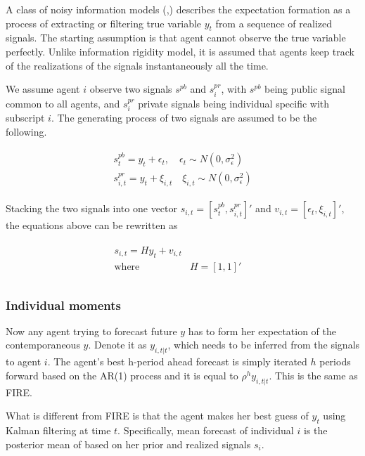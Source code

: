 \documentclass[]{article}
\begin{document}
	A class of noisy information models (\citet{},\citet{}) describes the expectation formation as a process of extracting or filtering true variable $y_t$ from a sequence of realized signals. The starting assumption is that agent cannot observe the true variable perfectly. Unlike information rigidity model, it is assumed that agents keep track of the realizations of the signals instantaneously all the time. 
	
	We assume agent $i$ observe two signals $s^{pb}$ and $s^{pr}_i$, with $s^{pb}$ being public signal common to all agents, and $s^{pr}_i$ private signals being individual specific with subscript $i$. The generating process of two signals are assumed to be the following.
	
	\begin{eqnarray}
		\begin{aligned}
			s^{pb}_t = y_t + \epsilon_t, \quad \epsilon_t \sim N(0,\sigma^2_\epsilon)\\ 
			s^{pr}_{i,t} = y_t + \xi_{i,t} \quad \xi_{i,t} \sim N(0,\sigma^2_\epsilon)
		\end{aligned}
	\end{eqnarray}
	
	Stacking the two signals into one vector $s_{i,t} = [s^{pb}_t,s^{pr}_{i,t}]'$ and $v_{i,t}= [\epsilon_t,\xi_{i,t}]'$, the equations above can be rewritten as 
	
	\begin{eqnarray}
		\begin{aligned}
			s_{i,t} = H y_{t} + v_{i,t} \\
			\text{where } & H=[1,1]' \quad \\
		\end{aligned}
	\end{eqnarray}
	
	
	\subsubsection{Individual moments }
	
	Now any agent trying to forecast future $y$ has to form her expectation of the contemporaneous $y$. Denote it as  $y_{i,t|t}$, which needs to be inferred from the signals to agent $i$. The agent's best h-period ahead forecast is simply iterated $h$ periods forward based on the AR(1) process and it is equal to $\rho^h y_{i,t|t}$. This is the same as FIRE.
	
	What is different from FIRE is that the agent makes her best guess of $y_t$ using Kalman filtering at time $t$. Specifically, mean forecast of individual $i$ is the posterior mean of based on her prior and realized signals $s_i$. 
	
\end{document}
